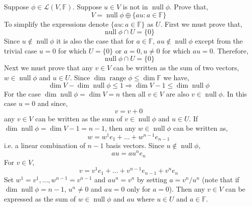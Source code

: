\documentclass[11pt,a4paper]{scrartcl}
\DeclareMathOperator{\range}{range}
\DeclareMathOperator{\nspace}{null}
\newcommand{\lmap}[2]{\mathcal{L}(#1,#2)}
\newcounter{problem}
\begin{document}
\begin{problem}[3.B.29]
{
    Suppose $\phi\in\lmap{V}{\mathbb{F}}$. Suppose $u\in V$
    is not in $\nspace \phi$. Prove that,
    \[
        V = \nspace \phi \oplus \{au: a \in \mathbb{F} \}
    \]
}
{    
    To simplify the expressions denote
    $\{au: a \in \mathbb{F} \}$ as $U$.
    First we must prove that,
    \[
    \nspace \phi  \cap U
    =
    \{0\}
    \]
    Since $u \notin \nspace \phi$ it is also the case
    that for $a \in \mathbb{F}$, $au \notin \nspace \phi$
    except from the trivial case $u=0$ for which $U=\{0\}$
    or $a=0, u\neq 0$ for which $au=0$. Therefore,
    \[
    \nspace \phi \cap
    U =
    \{0\}
    \]
    Next we must prove that any $v\in V$ can be written
    as the sum of two vectors, $w \in \nspace \phi$
    and $u \in U$. Since
    $\dim \range \phi \leq \dim \mathbb{F}$ we have,
    \[
    \dim V - \dim \nspace \phi \leq 1
    \Rightarrow
    \dim V -1 \leq \dim \nspace \phi
    \]
    For the case $\dim \nspace \phi=\dim V=n$ then
    all $v \in V$ are also $v \in \nspace \phi$. In this case
    $u=0$ and since,
    \[
    v = v+0
    \]
    any $v\in V$ can be written as the sum of
    $v \in \nspace \phi$ and $u \in U$.
    If $\dim \nspace \phi=\dim V-1=n-1$, then any
    $w \in \nspace \phi$ can be written as,
    \[
    w = w^1 e_1 + \ldots + w^{n-1} e_{n-1}
    \]
    i.e. a linear combination of $n-1$ basis vectors. Since
    $u \notin \nspace \phi$,
    \[
    au = a u^n e_n
    \]
    For $v \in V$,
    \[
    v = v^1 e_1 + \ldots + v^{n-1} e_{n-1} + v^n e_n
    \]
    Set $w^1=v^1,\ldots,w^{n-1}=v^{n-1}$ and
    $a u^n=v^n$ by setting $a=v^n/u^n$ (note that if 
    $\dim \nspace \phi=n-1$,
    $u^n \neq 0$ and $au=0$ only for $a=0$). Then any $v \in V$ can be expressed as the
    sum of $w \in \nspace \phi$ and $au$ where $u \in U$ 
    and $a \in \mathbb{F}$.
}
\end{problem}
\end{document}
